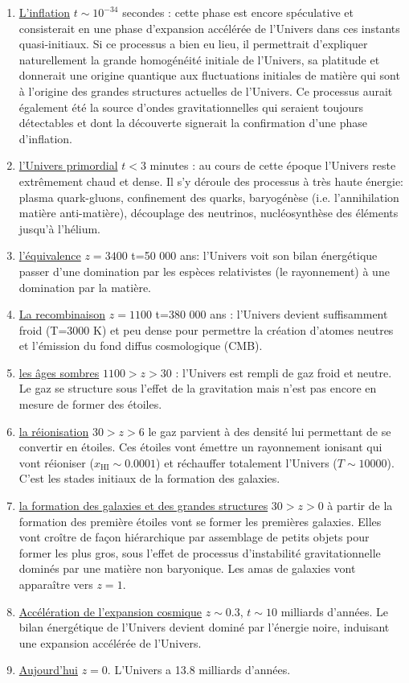 \begin{enumerate}
\item \underline{L'inflation} $t\sim 10^{-34}$ secondes :  cette phase est encore spéculative et consisterait en une phase d'expansion accélérée de l'Univers dans ces instants quasi-initiaux. Si ce processus a bien eu lieu, il permettrait d'expliquer naturellement la grande homogénéité initiale de l'Univers, sa platitude et donnerait une origine quantique aux fluctuations initiales de matière qui sont à l'origine des grandes structures actuelles de l'Univers. Ce processus aurait également été la source d'ondes gravitationnelles qui seraient toujours détectables et dont la découverte signerait la confirmation d'une phase d'inflation.
\item \underline{l'Univers primordial} $t<3$ minutes : au cours de cette époque l'Univers reste extrêmement chaud et dense. Il s'y déroule des processus à très haute énergie: plasma quark-gluons, confinement des quarks, baryogénèse (i.e. l'annihilation matière anti-matière), découplage des neutrinos, nucléosynthèse des éléments jusqu'à l'hélium.
\item \underline{l'équivalence} $z=3400$ t=50 000 ans: l'Univers voit son bilan énergétique passer d'une domination par les espèces relativistes (le rayonnement) à une domination par la matière.
\item \underline{La recombinaison} $z=1100$ t=380 000 ans : l'Univers devient suffisamment froid (T=3000 K) et peu dense pour permettre la création d'atomes neutres et l'émission du fond diffus cosmologique (CMB). 
\item \underline{les âges sombres} $1100>z>30$ : l'Univers est rempli de gaz froid et neutre. Le gaz se structure sous l'effet de la gravitation mais  n'est pas encore en mesure de former des étoiles. 
\item \underline{la réionisation} $30>z>6$ le gaz parvient à des densité lui permettant de se convertir en étoiles. Ces étoiles vont émettre un rayonnement ionisant qui vont réioniser ($x_\mathrm{HI}\sim0.0001$) et réchauffer totalement l'Univers ($T\sim 10000$). C'est les stades initiaux de la formation des galaxies.
\item \underline{la formation des galaxies et des grandes structures} $30>z>0$ à partir de la formation des première étoiles vont se former les premières galaxies. Elles vont croître de façon hiérarchique par assemblage de petits objets pour former les plus gros, sous l'effet de processus d'instabilité gravitationnelle dominés par une matière non baryonique. Les amas de galaxies vont apparaître vers $z=1$.
\item \underline{Accélération de l'expansion cosmique} $z\sim 0.3$, $t\sim 10$ milliards d'années. Le bilan énergétique de l'Univers devient dominé par l'énergie noire, induisant une expansion accélérée de l'Univers.
\item \underline{Aujourd'hui} $z=0$. L'Univers a 13.8 milliards d'années.
\end{enumerate}


